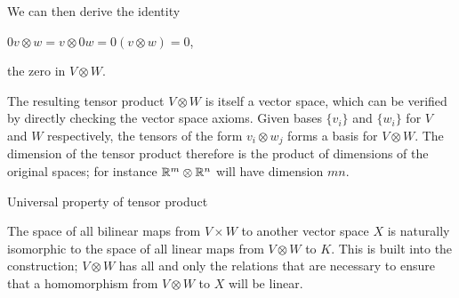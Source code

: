 We can then derive the identity

    $0v\otimes w=v\otimes 0w=0(v\otimes w)=0$,

the zero in $V \otimes W$.

The resulting tensor product $V \otimes W$ is itself a vector space, 
which can be verified by directly checking the vector space axioms. 
Given bases $\{v_i\}$ and $\{w_i\}$ for $V$ and $W$ respectively, 
the tensors of the form $v_i \otimes w_j$ forms a basis for $V \otimes W$. 
The dimension of the tensor product therefore is the product of dimensions 
of the original spaces; for instance ${\Bbb R}^m \otimes {\Bbb R}^n$ will have dimension $mn$.

\msk


Universal property of tensor product

The space of all bilinear maps from $V\times W$ to another vector space $X$ is naturally 
isomorphic to the space of all linear maps from $V \otimes W$ to $K$. This is built 
into the construction; $V\otimes W$ has all and only the relations that are necessary 
to ensure that a homomorphism from $V\otimes W$ to $X$ will be linear.
